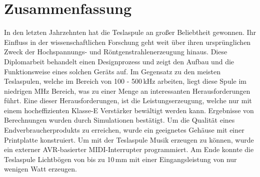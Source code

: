 \vspace{3cm}

\begingroup
\let\clearpage\relax
\chapter*{Zusammenfassung}
\endgroup

In den letzten Jahrzehnten hat die Teslaspule an großer Beliebtheit gewonnen. Ihr Einfluss in der wissenschaftlichen Forschung geht weit über ihren ursprünglichen Zweck der Hochspannungs- und Röntgenstrahlenerzeugung hinaus. Diese Diplomarbeit behandelt einen Designprozess und zeigt den Aufbau und die Funktionsweise eines solchen Geräts auf. Im Gegensatz zu den meisten Teslaspulen, welche im Bereich von 100 - 500\,kHz arbeiten, liegt diese Spule im niedrigen MHz Bereich, was zu einer Menge an interessanten Herausforderungen führt. Eine dieser Herausforderungen, ist die Leistungserzeugung, welche nur mit einem hocheffizienten Klasse-E Verstärker bewältigt werden kann. Ergebnisse von Berechnungen wurden durch Simulationen bestätigt. Um die Qualität eines Endverbraucherprodukts zu erreichen, wurde ein geeignetes Gehäuse mit einer Printplatte konstruiert. Um mit der Teslaspule Musik erzeugen zu können, wurde ein externer AVR-basierter MIDI-Interrupter programmiert. Am Ende konnte die Teslaspule Lichtbögen von bis zu 10\,mm mit einer Eingangsleistung von nur wenigen Watt erzeugen.

\newpage
\mbox{}
\newpage